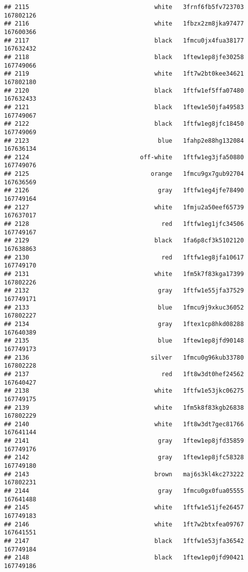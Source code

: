 \documentclass[
]{article}
\begin{document}
\begin{verbatim}
## 2115                                   white   3frnf6fb5fv723703 167802126
## 2116                                   white   1fbzx2zm8jka97477 167600366
## 2117                                   black   1fmcu0jx4fua38177 167632432
## 2118                                   black   1ftew1ep8jfe30258 167749066
## 2119                                   white   1ft7w2bt0kee34621 167802180
## 2120                                   black   1ftfw1ef5ffa07480 167632433
## 2121                                   black   1ftew1e50jfa49583 167749067
## 2122                                   black   1ftfw1eg8jfc18450 167749069
## 2123                                    blue   1fahp2e88hg132084 167636134
## 2124                               off-white   1ftfw1eg3jfa50880 167749076
## 2125                                  orange   1fmcu9gx7gub92704 167636569
## 2126                                    gray   1ftfw1eg4jfe78490 167749164
## 2127                                   white   1fmju2a50eef65739 167637017
## 2128                                     red   1ftfw1eg1jfc34506 167749167
## 2129                                   black   1fa6p8cf3k5102120 167638863
## 2130                                     red   1ftfw1eg8jfa10617 167749170
## 2131                                   white   1fm5k7f83kga17399 167802226
## 2132                                    gray   1ftfw1e55jfa37529 167749171
## 2133                                    blue   1fmcu9j9xkuc36052 167802227
## 2134                                    gray   1ftex1cp8hkd08288 167640389
## 2135                                    blue   1ftew1ep8jfd90148 167749173
## 2136                                  silver   1fmcu0g96kub33780 167802228
## 2137                                     red   1ft8w3dt0hef24562 167640427
## 2138                                   white   1ftfw1e53jkc06275 167749175
## 2139                                   white   1fm5k8f83kgb26838 167802229
## 2140                                   white   1ft8w3dt7gec81766 167641144
## 2141                                    gray   1ftew1ep8jfd35859 167749176
## 2142                                    gray   1ftew1ep8jfc58328 167749180
## 2143                                   brown   maj6s3kl4kc273222 167802231
## 2144                                    gray   1fmcu0gx0fua05555 167641488
## 2145                                   white   1ftfw1e51jfe26457 167749183
## 2146                                   white   1ft7w2btxfea09767 167641551
## 2147                                   black   1ftfw1e53jfa36542 167749184
## 2148                                   black   1ftew1ep0jfd90421 167749186

\end{verbatim}
\end{document}
